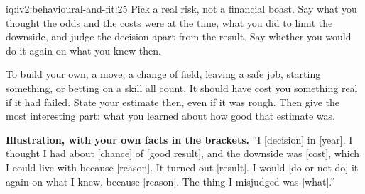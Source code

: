 \begin{solution}{iq:iv2:behavioural-and-fit:25}
Pick a real risk, not a financial boast. Say what you thought the odds and the costs were at the time, what you did to limit the downside, and judge the decision apart from the result. Say whether you would do it again on what you knew then.

To build your own, a move, a change of field, leaving a safe job, starting something, or betting on a skill all count. It should have cost you something real if it had failed. State your estimate then, even if it was rough. Then give the most interesting part: what you learned about how good that estimate was.

\textbf{Illustration, with your own facts in the brackets.} ``I [decision] in [year]. I thought I had about [chance] of [good result], and the downside was [cost], which I could live with because [reason]. It turned out [result]. I would [do or not do] it again on what I knew, because [reason]. The thing I misjudged was [what].''

\end{solution}

